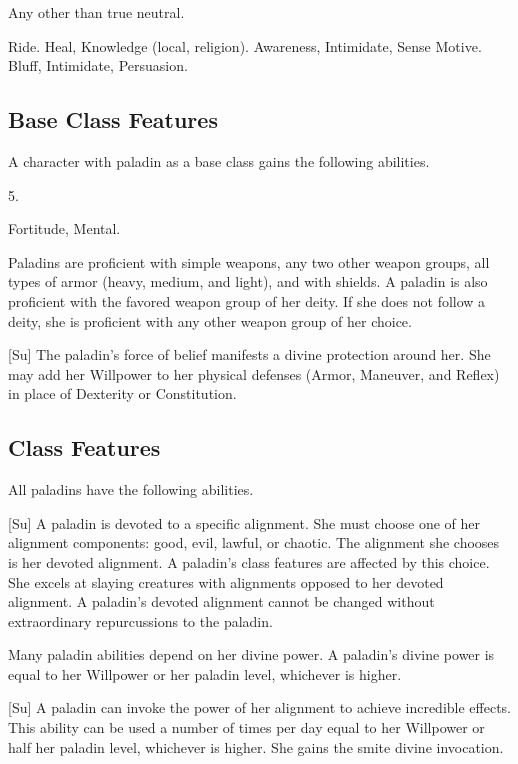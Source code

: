  Any other than true neutral.

 Ride.
 Heal, Knowledge (local, religion).
 Awareness, Intimidate, Sense Motive.
 Bluff, Intimidate, Persuasion.

\subsection{Base Class Features}
A character with paladin as a base class gains the following abilities.

 5.

  Fortitude,  Mental.

 Paladins are proficient with simple weapons,  any two other weapon groups,  all types of armor (heavy, medium, and light), and with shields.
A paladin is also proficient with the favored weapon group of her deity.
If she does not follow a deity, she is proficient with any other weapon group of her choice.

[Su]
The paladin's force of belief manifests a divine protection around her.
She may add her Willpower to her physical defenses (Armor, Maneuver, and Reflex) in place of Dexterity or Constitution.

\subsection{Class Features}
All paladins have the following abilities.

[Su]
A paladin is devoted to a specific alignment.
She must choose one of her alignment components: good, evil, lawful, or chaotic.
The alignment she chooses is her devoted alignment.
A paladin's class features are affected by this choice.
She excels at slaying creatures with alignments opposed to her devoted alignment.
A paladin's devoted alignment cannot be changed without extraordinary repurcussions to the paladin.

Many paladin abilities depend on her divine power.
A paladin's divine power is equal to her Willpower or her paladin level, whichever is higher.

[Su]
A paladin can invoke the power of her alignment to achieve incredible effects.
This ability can be used a number of times per day equal to her Willpower or half her paladin level, whichever is higher.
She gains the smite divine invocation.

